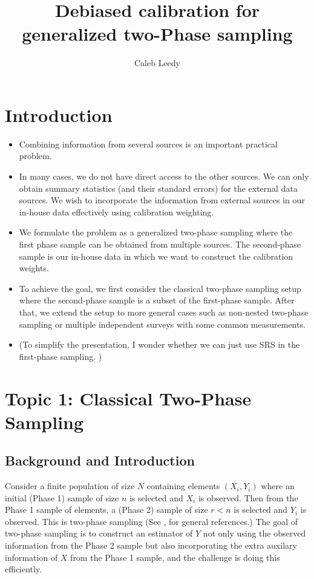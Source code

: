 \documentclass[12pt]{article}
\begin{document}
\title{Debiased calibration for generalized two-Phase sampling}
\author{Caleb Leedy}
\maketitle 


\section{Introduction}

\begin{itemize}
\item Combining information from several sources is an important practical problem. 
\item In many cases, we do not have direct access to the other sources. We can only obtain summary statistics (and their standard errors) for the external data sources. We wish to incorporate the information from external  sources in our in-house data effectively using calibration weighting.  
\item We formulate the problem as a generalized two-phase sampling where the first phase sample can be obtained from multiple sources. The second-phase sample is our in-house data in which we want to construct the calibration weights. 
\item To achieve the goal, we first consider  the  classical two-phase sampling setup where the second-phase sample is a subset of the first-phase sample. After that, we extend the setup to more general cases such as non-nested two-phase sampling or multiple independent surveys with some common measurements. 
\item (To simplify the presentation, I wonder whether we can just use SRS in the first-phase sampling. ) 
\end{itemize}
\section{Topic 1: Classical Two-Phase Sampling}

\subsection{Background and Introduction}

Consider a finite population of size $N$ containing elements $(X_i, Y_i)$ where
an initial (Phase 1) sample of size $n$ is selected and $X_i$ is observed. Then
from the Phase 1 sample of elements, a (Phase 2) sample of size $r < n$ is
selected and $Y_i$ is observed. This is two-phase sampling (See 
\cite{fuller2009sampling}, \cite{kim2024statistics} for general references.) The
goal of two-phase sampling is to construct an estimator of $Y$ not
only using the observed information from the Phase 2 sample but also
incorporating the extra auxilary information of $X$ from the Phase 1 sample, and
the challenge is doing this efficiently.
\end{document}
